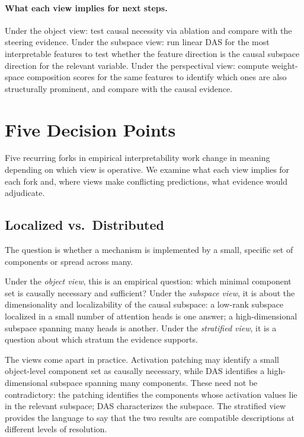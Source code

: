 \documentclass[11pt]{article}
\theoremstyle{remark}
\begin{document}
\paragraph{What each view implies for next steps.}
Under the object view: test causal necessity via ablation and compare
with the steering evidence.  Under the subspace view: run linear DAS
for the most interpretable features to test whether the feature
direction is the causal subspace direction for the relevant variable.
Under the perspectival view: compute weight-space composition scores
for the same features to identify which ones are also structurally
prominent, and compare with the causal evidence.

\section{Five Decision Points}\label{sec:decisions}

Five recurring forks in empirical interpretability work change in
meaning depending on which view is operative.  We examine what each
view implies for each fork and, where views make conflicting predictions,
what evidence would adjudicate.

\subsection{Localized vs.\ Distributed}

The question is whether a mechanism is implemented by a small, specific
set of components or spread across many.

Under the \emph{object view}, this is an empirical question: which
minimal component set is causally necessary and sufficient?  Under
the \emph{subspace view}, it is about the dimensionality and
localizability of the causal subspace: a low-rank subspace localized
in a small number of attention heads is one answer; a high-dimensional
subspace spanning many heads is another.  Under the \emph{stratified
view}, it is a question about which stratum the evidence supports.

The views come apart in practice.  Activation patching may identify a
small object-level component set as causally necessary, while DAS
identifies a high-dimensional subspace spanning many components.  These
need not be contradictory: the patching identifies the components whose
activation values lie in the relevant subspace; DAS characterizes the
subspace.  The stratified view provides the language to say that the
two results are compatible descriptions at different levels of
resolution.
\end{document}
